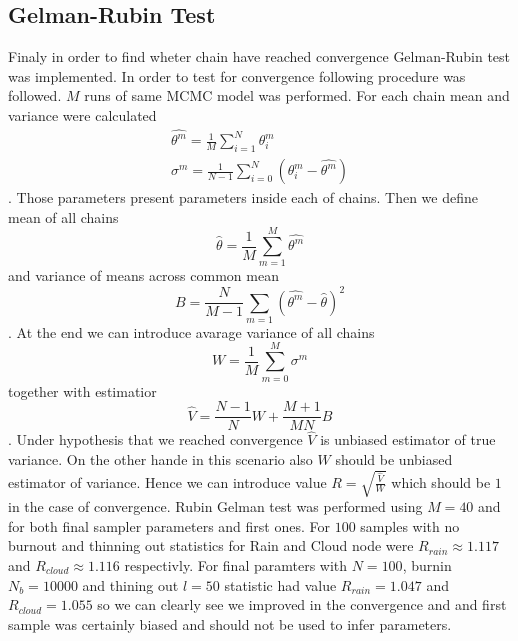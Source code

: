 \documentclass[12pt,a4paper]{article}
\begin{document}
\subsection{Gelman-Rubin Test}
\hspace{1cm} Finaly in order to find wheter chain have reached convergence Gelman-Rubin test was implemented. In order to test for convergence 
following procedure was followed. $M$ runs of same MCMC model was performed. For each chain mean and variance were calculated
\begin{align}
    \hat{\theta^m}=\frac{1}{M}\sum_{i=1}^N \theta^{m}_i\\
    \sigma^m=\frac{1}{N-1}\sum_{i=0}^N (\theta^m_i-\hat{\theta^m})
\end{align}. Those parameters present parameters inside each of chains. Then we define mean of all chains
\begin{equation*}
    \hat{\theta}=\frac{1}{M}\sum_{m=1}^M \hat{\theta^m}
\end{equation*} and variance of means across common mean
\begin{equation*}
    B=\frac{N}{M-1}\sum_{m=1}(\hat{\theta^m}-\hat{\theta})^2
\end{equation*}. At the end we can introduce avarage variance of all chains
\begin{equation*}
    W=\frac{1}{M}\sum_{m=0}^M\sigma^{m}
\end{equation*} together with estimatior
\begin{equation*}
    \hat{V}=\frac{N-1}{N}W+\frac{M+1}{MN}B
\end{equation*}. Under hypothesis that we reached convergence $\hat{V}$ is unbiased estimator of true variance. On the other hande in this scenario 
also $W$ should be unbiased estimator of variance. Hence we can introduce value $R=\sqrt{\frac{\hat{V}}{W}}$ which should be $1$ in the case of convergence. Rubin Gelman test
was performed using $M=40$ and for both final sampler parameters and first ones. For $100$ samples with no burnout and thinning out statistics for Rain and Cloud node were
$R_{rain}\approx 1.117$ and $R_{cloud}\approx  1.116$ respectivly. For final paramters with $N=100$, burnin $N_b=10000$ and thining out $l=50$ statistic had value $R_{rain}=1.047$
and $R_{cloud}=1.055$ so we can clearly see we improved in the convergence and and first sample was certainly biased and should not be used to infer parameters. 
\end{document}
